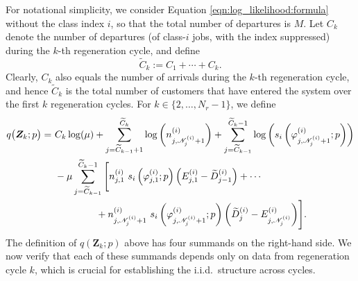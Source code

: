 \documentclass[11pt]{article}
\newcommand{\jp}[1]{\footnote{J-P: #1}}
\theoremstyle{remark}
\theoremstyle{definition}
\newcommand{\bs}[1]{{\boldsymbol #1 }}
\numberwithin{equation}{section}
\begin{document}
For notational simplicity, we consider Equation \eqref{eqn:log_likelihood:formula} without the class index $i$, so that the total number of departures is $M$. Let $C_k$ denote the number of departures (of class-$i$ jobs, with the index suppressed) during the $k$-th regeneration cycle, and define
\[
\widetilde{C}_k := C_1 + \cdots + C_k.
\]
Clearly, $C_k$ also equals the number of arrivals during the $k$-th regeneration cycle, and hence $\widetilde{C}_k$ is the total number of customers that have entered the system over the first $k$ regeneration cycles. For $k \in \{2, \ldots, N_r - 1\}$, we define
\begin{align}\label{eqn:q(Z;p):formula}
    q\big(\bs{Z}_k; p\big) = \ &C_k \log(\mu) 
    + \sum_{j=\widetilde{C}_{k-1}+1}^{\widetilde{C}_k} 
    \log\left(n^{(i)}_{j, {\mathscr N}^{(i)}_{j}+1}\right)
    + \sum_{j=\widetilde{C}_{k-1}}^{\widetilde{C}_k-1}
    \log\left(
    s_i\left(\varphi^{(i)}_{j, {\mathscr N}^{(i)}_{j}+1}; p\right)\right)
    \notag
    \\
    &- \mu \sum_{j=\widetilde{C}_{k-1}}^{\widetilde{C}_k-1} \Bigg[
    n^{(i)}_{j,1} \ s_i\left(\varphi^{(i)}_{j,1}; p\right)
    \Big(E^{(i)}_{j,1} - \widetilde{D}^{(i)}_{j-1}\Big)
    + \cdots \notag
    \\
    &\hspace{1.5cm}
    + n^{(i)}_{j, {\mathscr N}^{(i)}_{j}+1}
    \ s_i\left(\varphi^{(i)}_{j, {\mathscr N}^{(i)}_{j}+1}; p\right)
    \bigg(\widetilde{D}^{(i)}_{j} - E^{(i)}_{j,{\mathscr N}^{(i)}_{j}}\bigg)
    \Bigg].
\end{align}
The definition of $q(\bs{Z}_k;p)$ above has four summands on the right-hand side.
We now verify that each of these summands depends only on data from regeneration cycle $k$, which is crucial for establishing the i.i.d.\ structure across cycles.
\end{document}
